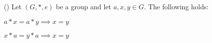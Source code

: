   \textnormal{()}
  Let $(G, *, e)$ be a group and let $a, x, y \in G$.
  The following holds:
  \begin{myenum}
    \item $a * x = a * y \implies x = y$ 
    \item $x * a = y * a \implies x = y$
  \end{myenum}
